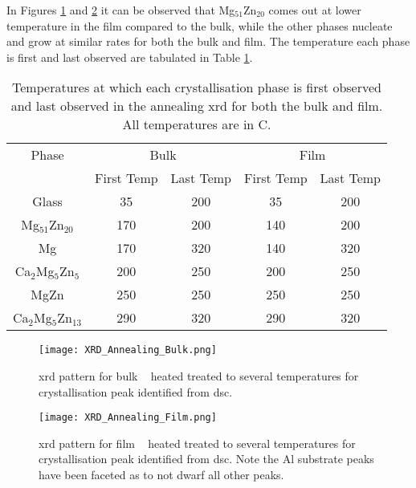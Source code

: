 \documentclass[a4paper,12pt,oneside]{article}%
\begin{document}
In Figures \ref{fig:XRD_Annealing_Bulk} and \ref{fig:XRD_Annealing_Film} it can be observed that Mg$_{51}$Zn$_{20}$ comes out at lower temperature in the film compared to the bulk, while the other phases nucleate and grow at similar rates for both the bulk and film. The temperature each phase is first and last observed are tabulated in Table \ref{tab:Crystal_Sequence}. 

\begin{table}[h]
	\centering
	\begin{tabular}{ c c c c c }
		\toprule
		Phase & \multicolumn{2}{c}{Bulk} & \multicolumn{2}{c}{Film}                 \\
		& First Temp & Last Temp & First Temp & Last Temp \\
		\midrule
		Glass 						& 35 & 200 & 35 & 200 \\
		Mg$_{51}$Zn$_{20}$ \cite{Zhang2013, Khan1989} & 170 & 200 & 140 & 200 \\
		Mg 							& 170 & 320 & 140 & 320 \\
		Ca$_{2}$Mg$_{5}$Zn$_{5}$ \cite{Zhang2013, Cao2016} & 200 & 250 & 200 & 250 \\
		MgZn \cite{Khan1989} & 250 & 250 & 250 & 250 \\
		Ca$_{2}$Mg$_{5}$Zn$_{13}$ \cite{Zhang2013, Zhang2012, Zhang2011} & 290 & 320 & 290 & 320 \\
		\bottomrule
	\end{tabular}
	\caption{Temperatures at which each crystallisation phase is first observed and last observed in the annealing \acrshort{xrd} for both the bulk and film. All temperatures are in \degree C.}
	\label{tab:Crystal_Sequence}
\end{table}

\begin{figure}[b]
	\centering
	\texttt{[image: XRD\_Annealing\_Bulk.png]}
	\caption[Table of contents Capition]{\acrshort{xrd} pattern for bulk \MgZnCa~ heated treated to several temperatures for crystallisation peak identified from \acrshort{dsc}.}
	\label{fig:XRD_Annealing_Bulk}
\end{figure}

\begin{figure}[b]
	\centering
	\texttt{[image: XRD\_Annealing\_Film.png]}
	\caption[Table of contents Capition]{\acrshort{xrd} pattern for film \MgZnCa~ heated treated to several temperatures for crystallisation peak identified from \acrshort{dsc}. Note the Al substrate peaks have been faceted as to not dwarf all other peaks.}
	\label{fig:XRD_Annealing_Film}
\end{figure}
\end{document}
